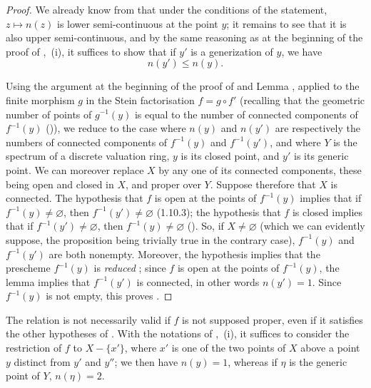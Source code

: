 \begin{proof}
We already know from  that under the conditions of the statement, $z\mapsto n(z)$ is lower semi-continuous at the point $y$; it remains to see that it is also upper semi-continuous, and by the same reasoning as at the beginning of the proof of ,~(i), it suffices to show that if $y'$ is a generization of $y$, we have
\begin{equation}
\tag{15.5.7.1}
\label{IV.15.5.7.1}
  n(y') \leq n(y).
\end{equation}

Using the argument at the beginning of the proof of  and Lemma , applied to the finite morphism $g$ in the Stein factorisation $f=g\circ f'$ (recalling that the geometric number of points of $g^{-1}(y)$ is equal to the number of connected components of $f^{-1}(y)$ ()), we reduce to the case where $n(y)$ and $n(y')$ are respectively the numbers of connected components of $f^{-1}(y)$ and $f^{-1}(y')$, and where $Y$ is the spectrum of a discrete valuation ring, $y$ is its closed point, and $y'$ is its generic point.
We can moreover replace $X$ by any one of its connected components, these being open and closed in $X$, and proper over $Y$.
Suppose therefore that $X$ is connected. The hypothesis that $f$ is open at the points of $f^{-1}(y)$ implies that if $f^{-1}(y)\neq\varnothing$, then $f^{-1}(y')\neq\varnothing$ (1.10.3); the hypothesis that $f$ is closed implies that if $f^{-1}(y')\neq\varnothing$, then $f^{-1}(y)\neq\varnothing$ ().
So, if $X\neq\varnothing$ (which we can evidently suppose, the proposition being trivially true in the contrary case), $f^{-1}(y)$ and $f^{-1}(y')$ are both nonempty.
Moreover, the hypothesis implies that the prescheme $f^{-1}(y)$ is \emph{reduced} ; since $f$ is open at the points of $f^{-1}(y)$, the lemma  implies that $f^{-1}(y')$ is connected, in other words $n(y')=1$.
Since $f^{-1}(y)$ is not empty, this proves .
\end{proof}

\begin{remarks}[15.5.8]
\label{IV.15.5.8}
The relation  is not necessarily valid if $f$ is not supposed proper, even if it satisfies the other hypotheses of .
With the notations of ,~(i), it suffices to consider the restriction of $f$ to $X-\{x'\}$, where $x'$ is one of the two points of $X$ above a point $y$ distinct from $y'$ and $y''$; we then have $n(y)=1$, whereas if $\eta$ is the generic point of $Y$, $n(\eta)=2$.
\end{remarks}

